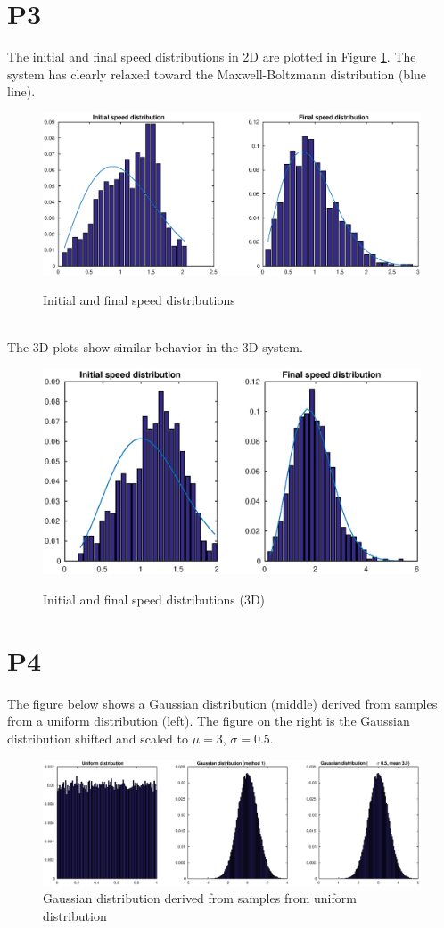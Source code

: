 \documentclass[a4paper,11pt]{article}
\numberwithin{equation}{section}
\begin{document}
\section{P3}
The initial and final speed distributions in 2D are plotted in Figure \ref{fig:energyplot}.
The system has clearly relaxed toward the Maxwell-Boltzmann distribution (blue line).
\begin{figure}[h]
 \caption{Initial and final speed distributions}
 \centering
   \includegraphics[width=\textwidth]{SpeedDist2D}
 \label{fig:energyplot}
\end{figure}
\\
The 3D plots show similar behavior in the 3D system.
\begin{figure}[h]
 \caption{Initial and final speed distributions (3D)}
 \centering
   \includegraphics[width=\textwidth]{SpeedDist3D}
 \label{fig:energyplot3d}
\end{figure}

\section{P4}
The figure below shows a Gaussian distribution (middle) derived from samples from a uniform distribution (left).
The figure on the right is the Gaussian distribution shifted and scaled to $\mu =3$, $\sigma=0.5$.
\begin{figure}[h]
 \caption{Gaussian distribution derived from samples from uniform distribution}
 \centering
   \includegraphics[width=\textwidth]{p4_distributions}
\end{figure}
\end{document}
